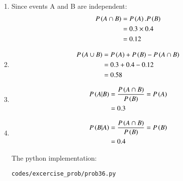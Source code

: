 \renewcommand{\theequation}{\theenumi}
\begin{enumerate}

\item Since events A and B are independent: 
\begin{align}
P\left(A \cap B\right) &= P\left(A\right).P\left(B\right)\\
&= 0.3 \times 0.4\\
&= 0.12
\end{align}

\item  
\begin{align}
P\left(A \cup B\right) &=  P\left(A\right) + P\left(B\right) - P\left(A \cap B\right) \\
&= 0.3 + 0.4 - 0.12\\
&= 0.58
\end{align}

\item  
\begin{align}
P\left(A|B\right) &= \frac{P\left(A \cap B\right)}{P\left(B\right)} = P\left(A\right)\\
&= 0.3
\end{align}

\item  
\begin{align}
P\left(B|A\right) &= \frac{P\left(A \cap B\right)}{P\left(B\right)} =  P\left(B\right)\\
&= 0.4
\end{align}

The python implementation:
\begin{lstlisting}
codes/excercise_prob/prob36.py
\end{lstlisting}

\end{enumerate}
